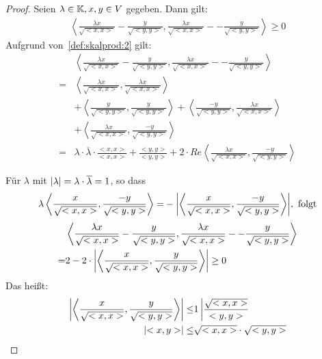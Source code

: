 \begin{proof}
	Seien $\lambda \in \mathbb{K}, x,y \in V$ gegeben. 
	Dann gilt:
	\begin{align*}
		\left< \frac{\lambda x}{\sqrt{<x,x>}} - \frac{y}{\sqrt{<y,y>}} , 
		 \frac{\lambda x}{\sqrt{<x,x>}} - - \frac{y}{\sqrt{<y,y>}} \right> \geq 0
	\end{align*}
	Aufgrund von~\ref{def:skalprod:2} gilt:
	\begin{align*}
	 & \left< \frac{\lambda x}{\sqrt{<x,x>}} - \frac{y}{\sqrt{<y,y>}} , 
		 \frac{\lambda x}{\sqrt{<x,x>}} - - \frac{y}{\sqrt{<y,y>}} \right> \\
	= &
	\left< \frac{\lambda x}{\sqrt{<x,x>}}, \frac{\lambda x}{\sqrt{<x,x>}} \right> \\
		& + \left< \frac{y}{\sqrt{<y,y>}}, \frac{y}{\sqrt{<y,y>}} \right> 
		+ \left< \frac{-y}{\sqrt{<y,y>}}, \frac{\lambda x}{\sqrt{<x,x>}} \right> \\
		&+ \left< \frac{\lambda x}{\sqrt{<x,x>}}, \frac{-y}{\sqrt{<y,y>}}\right> \\
	= & \lambda \cdot \overline{\lambda} \cdot \frac{<x,x>}{<x,x>} + \frac{<y,y>}{<y,y>} 
		+ 2 \cdot Re \left< \frac{\lambda x}{\sqrt{<x,x>}}, \frac{-y }{\sqrt{<y,y>}} \right>
	\end{align*}

Für $\lambda$ mit $\abs{\lambda} = \lambda \cdot \overline{\lambda} = 1$, so 
	dass
	\begin{align*}
		\lambda \left< \frac{x}{\sqrt{<x,x>}}, \frac{-y}{\sqrt{<y,y>}} \right>
		= & - \abs{ \left< \frac{x}{\sqrt{<x,x>}}, \frac{-y}{\sqrt{<y,y>}} 
			\right> }, \text{ folgt} \\
	\end{align*}
	\begin{align*}
		& \left< \frac{\lambda x}{\sqrt{<x,x>}} - \frac{y}{\sqrt{<y,y>}} , 
		 \frac{\lambda x}{\sqrt{<x,x>}} - - \frac{y}{\sqrt{<y,y>}} \right> \\
		= & 2 - 2 \cdot \abs{ \left< \frac{x}{\sqrt{<x,x>}}, \frac{y}{\sqrt{<y,y>}} 
		 \right>} \geq 0
	\end{align*} 
	Das heißt:
	\begin{align*}
		\abs{\left< \frac{x}{\sqrt{<x,x>}} , \frac{y}{\sqrt{<y,y>}} \right>} \leq & 1 
		\left\vert \frac{\sqrt{<x,x>}}{<y,y>}\right. \\
		\abs{<x,y>} \leq & \sqrt{<x,x>} \cdot \sqrt{<y,y>}
	\end{align*}
\end{proof}

